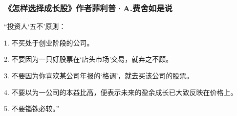 \subsubsection*{《怎样选择成长股》作者菲利普·A.费舍如是说}

“投资人‘五不’原则：
\par

1. 不买处于创业阶段的公司。
\par

2. 不要因为一只好股票在‘店头市场’交易，就弃之不顾。
\par

3. 不要因为你喜欢某公司年报的‘格调’，就去买该公司的股票。
\par

4. 不要以为一公司的本益比高，便表示未来的盈余成长已大致反映在价格上。
\par

5. 不要锱铢必较。”
\par
